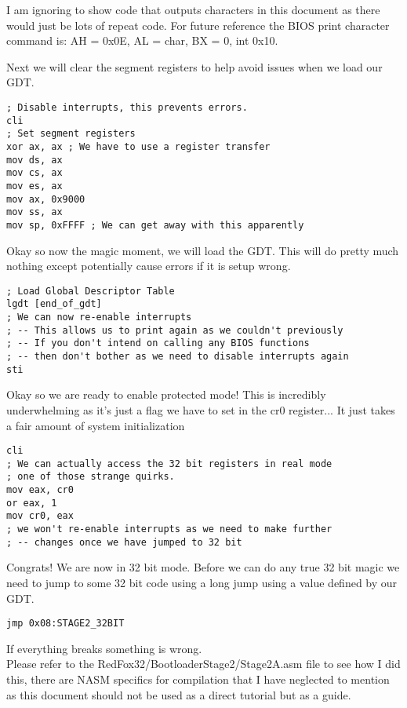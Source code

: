 \documentclass[10pt,a4paper]{article}
\begin{document}
I am ignoring to show code that outputs characters in this document as there would just be lots of repeat code. For future reference the BIOS print character command is: AH = 0x0E, AL = char, BX = 0, int 0x10.

Next we will clear the segment registers to help avoid issues when we load our GDT.
\begin{verbatim}
; Disable interrupts, this prevents errors.
cli
; Set segment registers
xor ax, ax ; We have to use a register transfer
mov ds, ax
mov cs, ax
mov es, ax
mov ax, 0x9000
mov ss, ax
mov sp, 0xFFFF ; We can get away with this apparently
\end{verbatim}

Okay so now the magic moment, we will load the GDT. This will do pretty much nothing except potentially cause errors if it is setup wrong.

\begin{verbatim}
; Load Global Descriptor Table
lgdt [end_of_gdt]
; We can now re-enable interrupts
; -- This allows us to print again as we couldn't previously
; -- If you don't intend on calling any BIOS functions
; -- then don't bother as we need to disable interrupts again
sti
\end{verbatim}

Okay so we are ready to enable protected mode! This is incredibly underwhelming as it's just a flag we have to set in the cr0 register... It just takes a fair amount of system initialization

\begin{verbatim}
cli
; We can actually access the 32 bit registers in real mode
; one of those strange quirks.
mov eax, cr0
or eax, 1
mov cr0, eax
; we won't re-enable interrupts as we need to make further
; -- changes once we have jumped to 32 bit
\end{verbatim}

Congrats! We are now in 32 bit mode. Before we can do any true 32 bit magic we need to jump to some 32 bit code using a long jump using a value defined by our GDT.

\begin{verbatim}
jmp 0x08:STAGE2_32BIT
\end{verbatim}
If everything breaks something is wrong.\\
Please refer to the RedFox32/BootloaderStage2/Stage2A.asm file to see how I did this, there are NASM specifics for compilation that I have neglected to mention as this document should not be used as a direct tutorial but as a guide.
\end{document}
